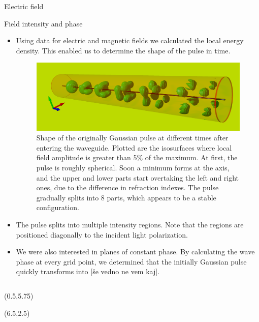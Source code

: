 \documentclass{beamer}
\newlength{\wideitemsep}
\let\olditem\item
\renewcommand{\item}{\setlength{\itemsep}{\wideitemsep}\olditem}
\newcommand{\blockpadding}{
  \rule[-0.6ex]{0pt}{2.5ex}
}
\begin{document}
\begin{columns}[t]
\begin{column}{0.596\textwidth}
\begin{block}{\blockpadding Electric field}
\end{block}
\begin{block}{\blockpadding Field intensity and phase}
\begin{itemize}
 \item Using data for electric and magnetic fields we calculated the local energy density. This enabled us to determine the shape of the pulse in time. 
 \begin{figure}[h]
  \centering
  \includegraphics[width=.825\textwidth]{./Povray/intensity_gauss}
  \caption{Shape of the originally Gaussian pulse at different times after entering the waveguide. Plotted are the isosurfaces where local field amplitude is greater than 5\% of the maximum. At first, the pulse is roughly spherical. Soon a minimum forms at the axis, and the upper and lower parts start overtaking the left and right ones, due to the difference in refraction indexes. The pulse gradually splits into 8 parts, which appears to be a stable configuration. }
 \end{figure}
 \item The pulse splits into multiple intensity regions. Note that the regions are positioned diagonally to the incident light polarization. 

 \item We were also interested in planes of constant phase. By calculating the wave phase at every grid point, we determined that the initially Gaussian pulse quickly transforms into [\v se vedno ne vem kaj]. 
\end{itemize}


\end{block}
 \end{column}

\end{columns}

\begin{textblock}{5.5}(0.5,5.75)
 

\end{textblock}

\begin{textblock}{8.5}(6.5,2.5)

\end{textblock}
\end{document}
